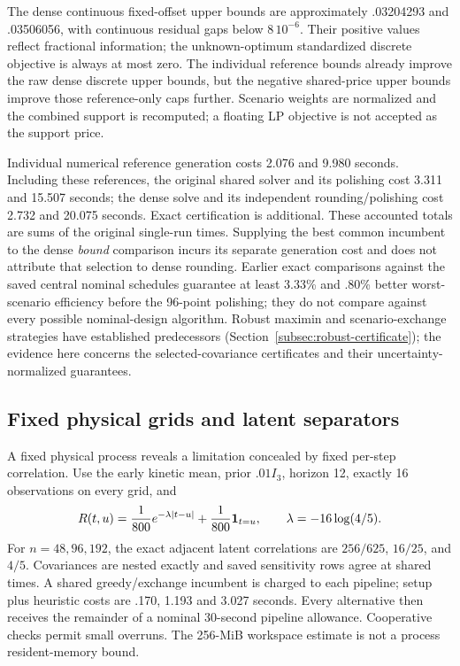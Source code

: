 The dense continuous fixed-offset upper bounds are approximately .03204293
and .03506056, with continuous residual gaps below $8\,10^{-6}$. Their
positive values reflect fractional information; the unknown-optimum
standardized discrete objective is always at most zero. The individual
reference bounds already improve the raw dense discrete upper bounds, but the
negative shared-price upper bounds improve those reference-only caps further.
Scenario weights are normalized and the combined support is recomputed;
a floating LP objective is not accepted as the support price.

Individual numerical reference generation costs 2.076 and 9.980 seconds.
Including these references, the original shared solver and its polishing cost
3.311 and 15.507 seconds; the dense solve and its independent rounding/polishing
cost 2.732 and 20.075 seconds. Exact certification is additional. These
accounted totals are sums of the original single-run times. Supplying the
best common incumbent to the dense \emph{bound} comparison incurs its separate
generation cost and does not attribute that selection to dense rounding.
Earlier exact comparisons against the saved central nominal schedules
guarantee at least 3.33\% and .80\% better worst-scenario efficiency before
the 96-point polishing; they do not compare against every possible
nominal-design algorithm. Robust maximin and scenario-exchange strategies
have established predecessors (Section~\ref{subsec:robust-certificate}); the
evidence here concerns the selected-covariance certificates and their
uncertainty-normalized guarantees.

\subsection{Fixed physical grids and latent separators}\label{subsec:grid-experiments}

A fixed physical process reveals a limitation concealed by fixed per-step
correlation. Use the early kinetic mean, prior $.01I_3$, horizon 12, exactly
16 observations on every grid, and
\begin{equation}\label{eq:fixed-physical-covariance}
 R(t,u)=\frac1{800}e^{-\lambda|t-u|}
       +\frac1{800}\mathbf 1_{t=u},\qquad \lambda=-16\log(4/5).
\end{equation}
For $n=48,96,192$, the exact adjacent latent correlations are
$256/625$, $16/25$, and $4/5$. Covariances are nested exactly and saved
sensitivity rows agree at shared times. A shared greedy/exchange incumbent is
charged to each pipeline; setup plus heuristic costs are .170, 1.193 and
3.027 seconds. Every alternative then receives the remainder of a nominal
30-second pipeline allowance. Cooperative checks permit small overruns.
The 256-MiB workspace estimate is not a process resident-memory bound.

